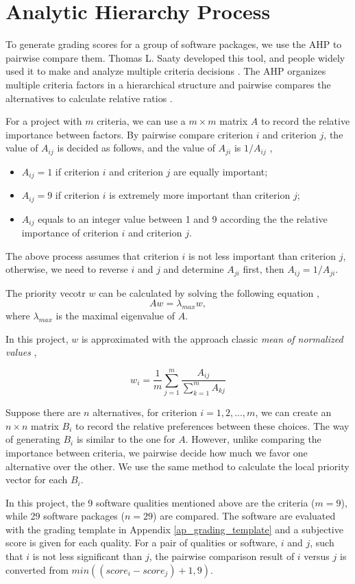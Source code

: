 \section{Analytic Hierarchy Process}
\label{sec_AHP}
To generate grading scores for a group of software packages, we use the AHP to pairwise compare them. Thomas L. Saaty developed this tool, and people widely used it to make and analyze multiple criteria decisions \cite{VaidyaEtAl2006}. The AHP organizes multiple criteria factors in a hierarchical structure and pairwise compares the alternatives to calculate relative ratios \cite{Saaty1990}.

For a project with $ m $ criteria, we can use a  $m\times m$ matrix $A$ to record the relative importance between factors. By pairwise compare criterion $i$ and criterion $j$, the value of $A_{ij}$ is decided as follows, and the value of $A_{ji}$ is $1/A_{ij}$ \cite{Saaty1990},
\begin{itemize}
	\item $A_{ij} = 1$ if criterion $i$ and criterion $j$ are equally important;
	\item $A_{ij} = 9$ if criterion $i$ is extremely more important than criterion $j$;
	\item $A_{ij}$ equals to an integer value between 1 and 9 according the the relative importance of criterion $i$ and criterion $j$.
\end{itemize}

The above process assumes that criterion $i$ is not less important than criterion $j$, otherwise, we need to reverse $i$ and $j$ and determine $A_{ji}$ first, then $A_{ij} = 1/A_{ji}$.

The priority vecotr $w$ can be calculated by solving the following equation \cite{Saaty1990}, \begin{equation}
Aw = \lambda_{max}w,
\end{equation}
where $\lambda_{max}$ is the maximal eigenvalue of $A$.

In this project, $w$ is approximated with the approach classic \textit{mean of normalized values}  \cite{AlessioEtAl2006},

\begin{equation}
w_i = \frac{1}{m}\sum_{j=1}^{m}\frac{A_{ij}}{\sum_{k=1}^{m}A_{kj}}
\end{equation}

Suppose there are $n$ alternatives, for criterion $i = 1, 2, ... , m$, we can create an $n\times n$ matrix $B_i$ to record the relative preferences between these choices. The way of generating $B_i$ is similar to the one for $A$. However, unlike comparing the importance between criteria, we pairwise decide how much we favor one alternative over the other. We use the same method to calculate the local priority vector for each $B_i$.

In this project, the 9 software qualities mentioned above are the criteria ($m = 9$), while 29 software packages ($n = 29$) are compared. The software are evaluated with the grading template in Appendix \ref{ap_grading_template} and a subjective score is given for each quality. For a pair of qualities or software, $i$ and $j$, such that $i$ is not less significant than $j$, the pairwise comparison result of $i$ versus $j$ is converted from $min((score_i - score_j) + 1, 9)$.
